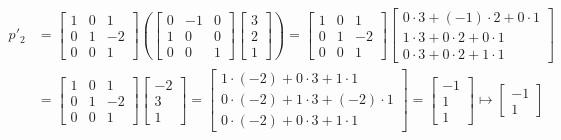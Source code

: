 \documentclass{article}
\begin{document}
\begin{align*}
	p'_2 & =  \begin{bmatrix}1&0&1\\ 0&1&-2\\0&0&1\end{bmatrix} \left( \begin{bmatrix}0&-1&0\\ 1&0&0\\ 0&0&1\end{bmatrix}\begin{bmatrix}3\\ 2\\ 1\end{bmatrix} \right)  =  \begin{bmatrix}1&0&1\\ 0&1&-2\\0&0&1\end{bmatrix}\begin{bmatrix}0\cdot 3+\left(-1\right)\cdot 2+0\cdot 1\\ 1\cdot 3+0\cdot 2+0\cdot 1\\ 0\cdot 3+0\cdot 2+1\cdot 1\end{bmatrix} \\
	& = \begin{bmatrix}1&0&1\\ 0&1&-2\\0&0&1\end{bmatrix}\begin{bmatrix}-2\\ 3\\ 1\end{bmatrix} = \begin{bmatrix}1\cdot \left(-2\right)+0\cdot 3+1\cdot 1\\ 0\cdot \left(-2\right)+1\cdot 3+\left(-2\right)\cdot 1\\ 0\cdot \left(-2\right)+0\cdot 3+1\cdot 1\end{bmatrix} = \begin{bmatrix}-1\\ 1\\ 1\end{bmatrix} \mapsto \begin{bmatrix}-1\\ 1\end{bmatrix}
\end{align*}
\end{document}
